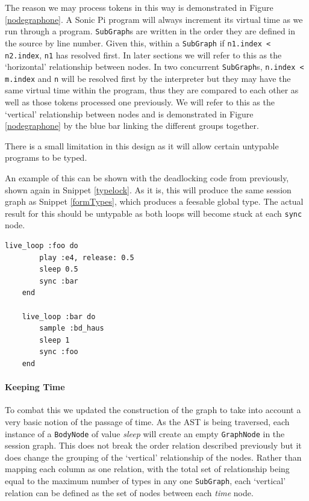 \documentclass[11pt, abstracton, twoside]{scrartcl}
\begin{document}
The reason we may process tokens in this way is demonstrated in Figure 
\ref{nodegraphone}. A Sonic Pi program will always increment its virtual 
time as we run through a program. \texttt{SubGraph}s are written in the order 
they are defined in the source by line number. Given this, within a 
\texttt{SubGraph} if \texttt{n1.index < n2.index}, \texttt{n1} has resolved 
first. In later sections we will refer to this as the `horizontal' relationship 
between nodes. In two concurrent \texttt{SubGraph}s, \texttt{n.index < m.index} 
and \texttt{n} will be resolved first by the interpreter but they may have the 
same virtual time within the program, thus they are compared to each other as 
well as those tokens processed one previously. We will refer to this as the 
`vertical' relationship between nodes and is demonstrated in Figure 
\ref{nodegraphone} by the blue bar linking the different groups together.

There is a small limitation in this design as it will allow certain untypable
programs to be typed.

An example of this can be shown with the deadlocking code from previously,
shown again in Snippet \ref{typelock}. As it is, this will produce the same session
graph as Snippet \ref{formTypes}, which produces a feesable global type.
The actual result for this should be untypable as both loops will become stuck
at each \texttt{sync} node. 

\begin{minipage}{\textwidth}
	\begin{lstlisting}[style = sonicpi]
	live_loop :foo do
	    play :e4, release: 0.5
	    sleep 0.5
	    sync :bar
	end

	live_loop :bar do
	    sample :bd_haus
	    sleep 1
	    sync :foo
	end
	\end{lstlisting}
	 \label{typelock}
\end{minipage}

\paragraph{Keeping Time}
To combat this we updated the construction of the graph to take into account
a very basic notion of the passage of time. As the AST is being traversed, each
instance of a \texttt{BodyNode} of value \emph{sleep} will create an empty
\texttt{GraphNode} in the session graph. This does not break the order relation
described previously but it does change the grouping of the `vertical' 
relationship of the nodes. Rather than mapping each column as one relation, with
the total set of relationship being equal to the maximum number of types in
any one \texttt{SubGraph}, each `vertical' relation can be defined as the
set of nodes between each \emph{time} node.
\end{document}
